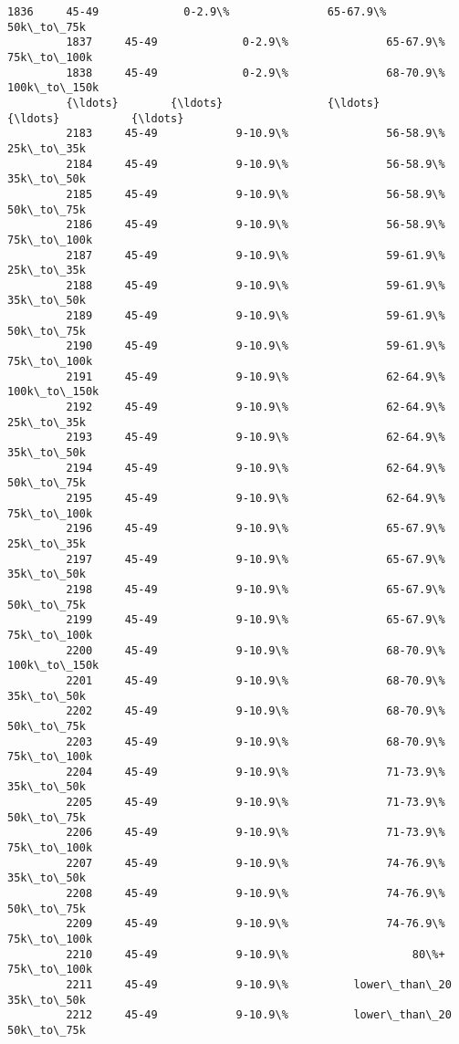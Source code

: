 \documentclass[11pt]{article}
\begin{document}
\begin{Verbatim}[commandchars=\\\{\}]
         1836     45-49             0-2.9\%               65-67.9\%    50k\_to\_75k   
         1837     45-49             0-2.9\%               65-67.9\%   75k\_to\_100k   
         1838     45-49             0-2.9\%               68-70.9\%  100k\_to\_150k   
         {\ldots}        {\ldots}                {\ldots}                    {\ldots}           {\ldots}   
         2183     45-49            9-10.9\%               56-58.9\%    25k\_to\_35k   
         2184     45-49            9-10.9\%               56-58.9\%    35k\_to\_50k   
         2185     45-49            9-10.9\%               56-58.9\%    50k\_to\_75k   
         2186     45-49            9-10.9\%               56-58.9\%   75k\_to\_100k   
         2187     45-49            9-10.9\%               59-61.9\%    25k\_to\_35k   
         2188     45-49            9-10.9\%               59-61.9\%    35k\_to\_50k   
         2189     45-49            9-10.9\%               59-61.9\%    50k\_to\_75k   
         2190     45-49            9-10.9\%               59-61.9\%   75k\_to\_100k   
         2191     45-49            9-10.9\%               62-64.9\%  100k\_to\_150k   
         2192     45-49            9-10.9\%               62-64.9\%    25k\_to\_35k   
         2193     45-49            9-10.9\%               62-64.9\%    35k\_to\_50k   
         2194     45-49            9-10.9\%               62-64.9\%    50k\_to\_75k   
         2195     45-49            9-10.9\%               62-64.9\%   75k\_to\_100k   
         2196     45-49            9-10.9\%               65-67.9\%    25k\_to\_35k   
         2197     45-49            9-10.9\%               65-67.9\%    35k\_to\_50k   
         2198     45-49            9-10.9\%               65-67.9\%    50k\_to\_75k   
         2199     45-49            9-10.9\%               65-67.9\%   75k\_to\_100k   
         2200     45-49            9-10.9\%               68-70.9\%  100k\_to\_150k   
         2201     45-49            9-10.9\%               68-70.9\%    35k\_to\_50k   
         2202     45-49            9-10.9\%               68-70.9\%    50k\_to\_75k   
         2203     45-49            9-10.9\%               68-70.9\%   75k\_to\_100k   
         2204     45-49            9-10.9\%               71-73.9\%    35k\_to\_50k   
         2205     45-49            9-10.9\%               71-73.9\%    50k\_to\_75k   
         2206     45-49            9-10.9\%               71-73.9\%   75k\_to\_100k   
         2207     45-49            9-10.9\%               74-76.9\%    35k\_to\_50k   
         2208     45-49            9-10.9\%               74-76.9\%    50k\_to\_75k   
         2209     45-49            9-10.9\%               74-76.9\%   75k\_to\_100k   
         2210     45-49            9-10.9\%                   80\%+   75k\_to\_100k   
         2211     45-49            9-10.9\%          lower\_than\_20    35k\_to\_50k   
         2212     45-49            9-10.9\%          lower\_than\_20    50k\_to\_75k   
         

\end{Verbatim}
\end{document}
